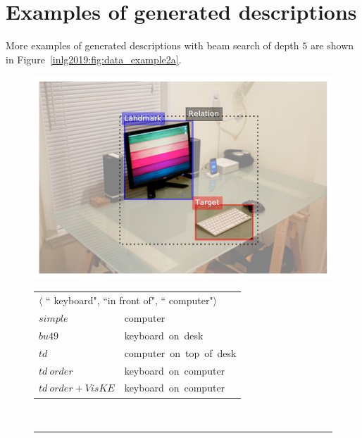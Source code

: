 \section{Examples of generated descriptions}
\label{appendix:generations}
More examples of generated descriptions with beam search of depth $5$ are shown in Figure~\ref{inlg2019:fig:data_example2a}. 
\begin{figure}[hb]
	\begin{minipage}{\textwidth}
		\centering
		\begin{minipage}{0.3\textwidth}
			\centering
			\includegraphics[scale=0.25]{studies/inlg2019/figures/2413204_keyboard_in_front_of_computer.pdf}
		\end{minipage}%
		\begin{minipage}{0.7\textwidth}%
			\begin{tabular}{|ll}
				\multicolumn{2}{|l}{$\langle$ ``{\color{red} keyboard}", ``in front of", ``{\color{blue} computer}"$\rangle$} \\
				$simple$         & {computer} \\
				$bu49$           & {keyboard~on~desk} \\
				$td$             & {computer~on~top~of~desk} \\
				$td~order$       & {keyboard~on~computer} \\
				$td~order+VisKE$ & {keyboard~on~computer} \\
			\end{tabular}%
		\end{minipage}\\
		\rule{\textwidth}{0.5pt}
		\begin{minipage}{0.3\textwidth}
			\centering

\end{minipage}
\end{minipage}
\end{figure}
